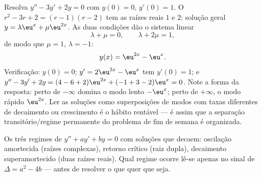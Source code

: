 \begin{example}\label{ex:b1:diffeq:cauchy2}
Resolva $y'' - 3y' + 2y = 0$ com $y(0) = 0$, $y'(0) = 1$. O
 $r^2 - 3r + 2 = (r - 1)(r - 2)$ tem as
raízes reais $1$ e $2$: solução geral $y = \lambda\eu^{x} +
\mu\eu^{2x}$. As duas condições dão o sistema linear
\[
\lambda + \mu = 0, \qquad \lambda + 2\mu = 1 ,
\]
de modo que $\mu = 1$, $\lambda = -1$:
\[
y(x) = \eu^{2x} - \eu^{x} .
\]
Verificação: $y(0) = 0$; $y' = 2\eu^{2x} - \eu^x$ tem $y'(0) = 1$; e
$y'' - 3y' + 2y = (4 - 6 + 2)\eu^{2x} + (-1 + 3 - 2)\eu^x = 0$.
Note a forma da resposta: perto de $-\infty$ domina o modo lento
$-\eu^x$; perto de $+\infty$, o modo rápido $\eu^{2x}$.
Ler as soluções como superposições de modos com taxas diferentes de
decaimento ou crescimento é o hábito rentável --- é assim que a
separação transitório/regime permanente do problema de fim de semana é
organizada.
\end{example}

\begin{omfigure}

{\small Os três regimes de $y'' + ay' + by = 0$ com soluções
que decaem: oscilação amortecida (raízes complexas), retorno crítico
(raiz dupla), decaimento superamortecido (duas raízes reais). Qual
regime ocorre lê-se apenas no sinal de $\Delta = a^2 - 4b$ ---
antes de resolver o que quer que seja.}
\end{omfigure}

